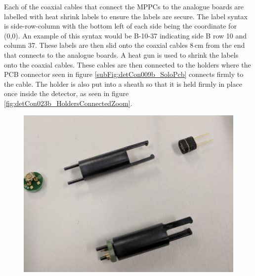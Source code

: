 Each of the coaxial cables that connect the MPPCs to the analogue boards are labelled with heat shrink labels to ensure the labels are secure. The label syntax is side-row-column with the bottom left of each side being the coordinate for (0,0). An example of this syntax would be B-10-37 indicating side B row 10 and column 37. These labels are then slid onto the coaxial cables 8\,cm from the end that connects to the analogue boards. A heat gun is used to shrink the labels onto the coaxial cables. These cables are then connected to the holders where the PCB connector seen in figure \ref{subFig:detCon009b_SoloPcb} connects firmly to the cable. The holder is also put into a sheath so that it is held firmly in place once inside the detector, as seen in figure \ref{fig:detCon023b_HoldersConnectedZoom}.

\begin{figure}[!h]
\centering
\begin{minipage}{.45\textwidth}
  \centering
  \includegraphics[width=\linewidth]{Chapter3/Figs/Raster/detCon017b_HoldersWithParts.png}
  \label{fig:detCon017b_HoldersWithParts}
\end{minipage}%
\qquad
\begin{minipage}{.45\textwidth}
  \centering

\end{minipage}
\end{figure}
